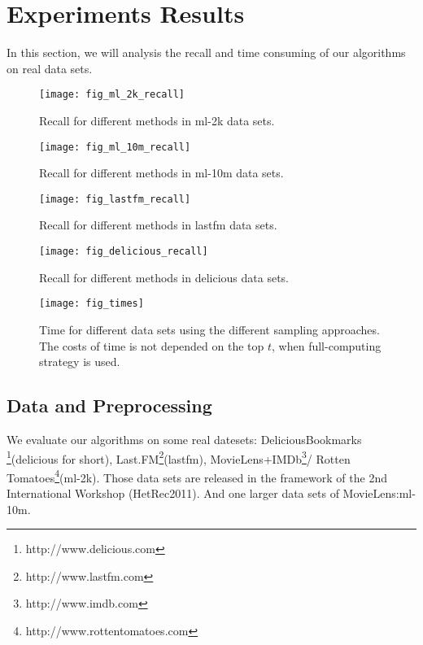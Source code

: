 \documentclass[letterpaper]{article}
\begin{document}
\section{Experiments Results}
In this section, we will analysis the recall
and time consuming of our algorithms on real data sets.
\begin{figure}[ht]
  \centering
  \texttt{[image: fig\_ml\_2k\_recall]}\\
  \caption{Recall for different methods in ml-2k data sets.}
  \label{fig:ml_2k_recall}
\end{figure}
\begin{figure}[ht]
  \centering
  \texttt{[image: fig\_ml\_10m\_recall]}\\
  \caption{Recall for different methods in ml-10m data sets.}
  \label{fig:ml_10m_recall}
\end{figure}


\begin{figure}[ht]
  \centering
  \texttt{[image: fig\_lastfm\_recall]}\\
  \caption{Recall for different methods in lastfm data sets.}
  \label{fig:lastfm_recall}
\end{figure}
\begin{figure}[ht]
  \centering
  \texttt{[image: fig\_delicious\_recall]}\\
  \caption{Recall for different methods in delicious data sets.
            }
  \label{fig:delicious_recall}
\end{figure}

\begin{figure}[ht]
  \centering
  \texttt{[image: fig\_times]}\\
  \caption{Time for different data sets using the different sampling approaches.
           The costs of time is not depended on the top $t$,
           when full-computing strategy is used.}
  \label{fig:Time}
\end{figure}


\subsection{Data and Preprocessing}
We evaluate our algorithms on some real datesets:
DeliciousBookmarks
\footnote{http://www.delicious.com}(delicious for short),
Last.FM\footnote{http://www.lastfm.com}(lastfm),
MovieLens+IMDb\footnote{http://www.imdb.com }/
Rotten Tomatoes\footnote{http://www.rottentomatoes.com}(ml-2k).
Those data sets are released in the framework of the 2nd International Workshop (HetRec2011).
And one larger data sets of MovieLens\cite{Harper2015}:ml-10m.
\end{document}
